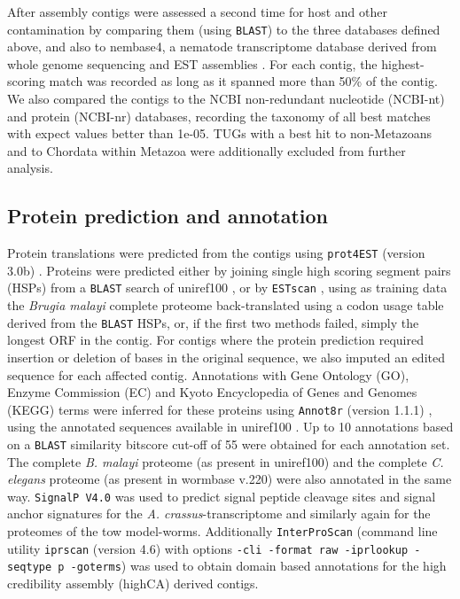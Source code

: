 \documentclass[10pt]{bmc_article}
\newenvironment{bmcformat}{\begin{raggedright}\baselineskip20pt\sloppy\setboolean{publ}{false}}{\end{raggedright}\baselineskip20pt\sloppy}
\begin{document}
\begin{bmcformat}
After assembly contigs were assessed a second time for host and other
contamination by comparing them (using \texttt{BLAST}) to the three
databases defined above, and also to nembase4, a nematode
transcriptome database derived from whole genome sequencing and EST
assemblies \cite{parkinson_nembase:resource_2004, pmid21550347}. For
each contig, the highest-scoring match was recorded as long as it
spanned more than 50\% of the contig. We also compared the contigs to
the NCBI non-redundant nucleotide (NCBI-nt) and protein (NCBI-nr)
databases, recording the taxonomy of all best matches with expect
values better than 1e-05. TUGs with a best hit to non-Metazoans and to
Chordata within Metazoa were additionally excluded from further
analysis.


\subsection*{Protein prediction and annotation}

Protein translations were predicted from the contigs using
\texttt{prot4EST} (version 3.0b)
\cite{wasmuth_prot4est:_2004}. Proteins were predicted either by
joining single high scoring segment pairs (HSPs) from a \texttt{BLAST}
search of uniref100 \cite{pmid18836194}, or by \texttt{ESTscan}
\cite{estscan}, using as training data the \textit{Brugia malayi}
complete proteome back-translated using a codon usage table derived
from the \texttt{BLAST} HSPs, or, if the first two methods failed,
simply the longest ORF in the contig. For contigs where the protein
prediction required insertion or deletion of bases in the original
sequence, we also imputed an edited sequence for each affected
contig. Annotations with Gene Ontology (GO), Enzyme Commission (EC)
and Kyoto Encyclopedia of Genes and Genomes (KEGG) terms were inferred
for these proteins using \texttt{Annot8r} (version 1.1.1)
\cite{schmid_annot8r:_2008}, using the annotated sequences available
in uniref100 \cite{pmid18836194}. Up to 10 annotations based on a
\texttt{BLAST} similarity bitscore cut-off of 55 were obtained for
each annotation set. The complete \textit{B. malayi} proteome (as
present in uniref100) and the complete \textit{C. elegans} proteome
(as present in wormbase v.220) were also annotated in the same
way. \texttt{SignalP V4.0} \cite{pmid21959131} was used to predict
signal peptide cleavage sites and signal anchor signatures for the
\textit{A. crassus}-transcriptome and similarly again for the
proteomes of the tow model-worms.  Additionally \texttt{InterProScan}
\cite{pmid11590104} (command line utility \texttt{iprscan} (version
4.6) with options \texttt{-cli -format raw -iprlookup -seqtype p
  -goterms}) was used to obtain domain based annotations for the high
credibility assembly (highCA) derived contigs.


\end{bmcformat}
\end{document}
